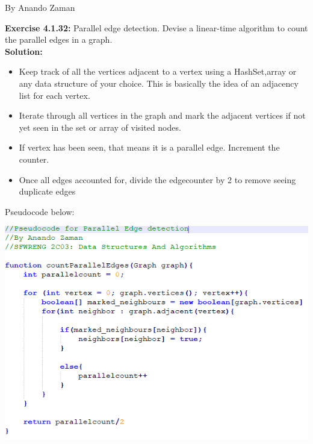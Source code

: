 \documentclass[11pt,fleqn]{article}
\begin{document}
By Anando Zaman

\textbf{Exercise 4.1.32:} Parallel edge detection. Devise a linear-time algorithm to count the parallel
edges in a graph.\\

\textbf{Solution:}
\begin{itemize}
	\item Keep track of all the vertices adjacent to a vertex using a HashSet,array or any data structure of your choice. This is basically the idea of an adjacency list for each vertex.
	
	\item Iterate through all vertices in the graph and mark the adjacent vertices if not yet seen in the set or array of visited nodes.
	
	\item If vertex has been seen, that means it is a parallel edge. Increment the counter.
	
	\item Once all edges accounted for, divide the edgecounter by 2 to remove seeing duplicate edges
\end{itemize}

Pseudocode below:

\begin{center}
	\includegraphics[scale=1]{4.1.32.png}
\end{center}
\end{document}
